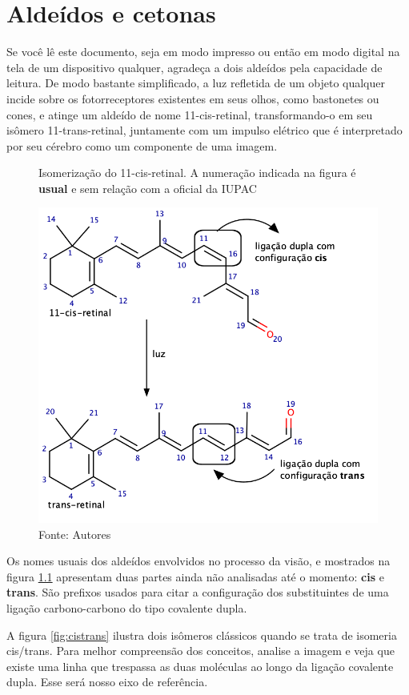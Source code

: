 \chapter{Aldeídos e cetonas}
\begin{mdframed}[backgroundcolor=orange!20,linewidth=0pt,roundcorner=10pt]
	\minitoc
\end{mdframed}
Se você lê este documento, seja em modo impresso ou então em modo digital na tela de um dispositivo qualquer, agradeça a dois aldeídos pela capacidade de leitura. De modo bastante simplificado, a luz refletida de um objeto qualquer incide sobre os fotorreceptores existentes em seus olhos, como bastonetes ou cones, e atinge um aldeído de nome 11-cis-retinal, transformando-o em seu isômero 11-trans-retinal, juntamente com um impulso elétrico que é  interpretado por seu cérebro como um componente de uma imagem.

\begin{figure}[h]
	\centering
	\caption{Isomerização do 11-cis-retinal. A numeração indicada na figura é \textbf{usual} e sem relação com a oficial da IUPAC}
	\vspace{0.5cm}
	\includegraphics[width=0.7\linewidth]{imagens/cistransretinal.png}
	\caption*{Fonte: Autores}
	\label{fig:cistransretinal}
\end{figure}

Os nomes usuais dos aldeídos envolvidos no processo da visão, e mostrados na figura \ref{fig:cistransretinal} apresentam duas partes ainda não analisadas até o momento: \textbf{cis} e \textbf{trans}. São prefixos usados para citar a configuração dos substituintes de uma ligação carbono-carbono do tipo covalente dupla.

A figura \ref{fig:cistrans} ilustra dois isômeros clássicos quando se trata de isomeria cis/trans. Para melhor compreensão dos conceitos, analise a imagem e veja que existe uma linha que trespassa as duas moléculas ao longo da ligação covalente dupla. Esse será nosso eixo de referência.

